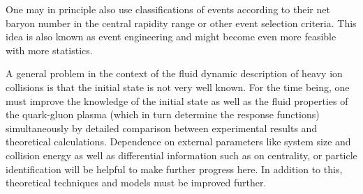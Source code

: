 One may in principle also use classifications of events according to their net baryon number  in the central rapidity range or other event selection criteria. This idea is also known as event engineering and might become even more feasible with more statistics.

A general problem in the context of the fluid dynamic description of heavy ion collisions is that the initial state is not very well known. For the time being,  one must improve the knowledge of the initial state as well as the fluid properties of the quark-gluon plasma (which in turn determine the response functions) simultaneously by detailed comparison between experimental results and theoretical calculations. Dependence on external parameters like system size and collision energy as well as differential information such as on centrality,   or particle identification will be helpful to make further progress here. In addition to this,  theoretical techniques and models must be improved further.

